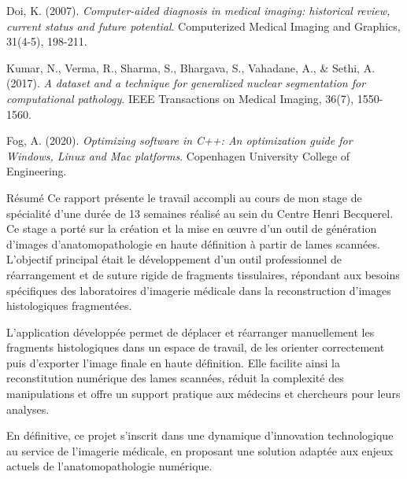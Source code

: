 \documentclass[12pt,a4paper]{report}
\begin{document}
\begin{thebibliography}{20}
Doi, K. (2007). 
\textit{Computer-aided diagnosis in medical imaging: historical review, current status and future potential}. 
Computerized Medical Imaging and Graphics, 31(4-5), 198-211.

Kumar, N., Verma, R., Sharma, S., Bhargava, S., Vahadane, A., \& Sethi, A. (2017). 
\textit{A dataset and a technique for generalized nuclear segmentation for computational pathology}. 
IEEE Transactions on Medical Imaging, 36(7), 1550-1560.

Fog, A. (2020). 
\textit{Optimizing software in C++: An optimization guide for Windows, Linux and Mac platforms}. 
Copenhagen University College of Engineering.

\end{thebibliography}

\newpage
\thispagestyle{empty}

\begin{resume}{Résumé}
Ce rapport présente le travail accompli au cours de mon stage de spécialité d'une durée de 13 semaines réalisé au sein du Centre Henri Becquerel. Ce stage a porté sur la création et la mise en œuvre d'un outil de génération d'images d'anatomopathologie en haute définition à partir de lames scannées. L'objectif principal était le développement d'un outil professionnel de réarrangement et de suture rigide de fragments tissulaires, répondant aux besoins spécifiques des laboratoires d'imagerie médicale dans la reconstruction d'images histologiques fragmentées.

L'application développée permet de déplacer et réarranger manuellement les fragments histologiques dans un espace de travail, de les orienter correctement puis d'exporter l'image finale en haute définition. Elle facilite ainsi la reconstitution numérique des lames scannées, réduit la complexité des manipulations et offre un support pratique aux médecins et chercheurs pour leurs analyses.

En définitive, ce projet s'inscrit dans une dynamique d'innovation technologique au service de l'imagerie médicale, en proposant une solution adaptée aux enjeux actuels de l'anatomopathologie numérique.
\end{resume}
\end{document}

